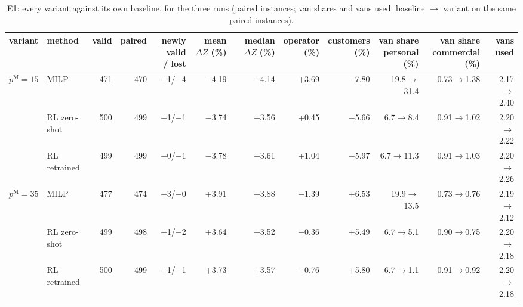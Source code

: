 \begin{table}[H]\centering
\scriptsize
\caption{E1: every variant against its own baseline, for the three runs (paired instances; van shares and vans used: baseline $\to$ variant on the same paired instances).}\label{tab:expE1}
\begin{adjustbox}{max width=\textwidth}\begin{tabular}{llrrrrrrrrrr}\toprule
variant & method & valid & paired & \shortstack{newly valid\\/ lost} & \shortstack{mean\\$\Delta Z$ (\%)} & \shortstack{median\\$\Delta Z$ (\%)} & \shortstack{operator\\(\%)} & \shortstack{customers\\(\%)} & \shortstack{van share\\personal (\%)} & \shortstack{van share\\commercial (\%)} & vans used \\ \midrule
$p^{\mathrm M}=15$ & MILP & 471 & 470 & +1/$-$4 & $-$4.19 & $-$4.14 & +3.69 & $-$7.80 & 19.8$\to$31.4 & 0.73$\to$1.38 & 2.17$\to$2.40 \\
 & RL zero-shot & 500 & 499 & +1/$-$1 & $-$3.74 & $-$3.56 & +0.45 & $-$5.66 & 6.7$\to$8.4 & 0.91$\to$1.02 & 2.20$\to$2.22 \\
 & RL retrained & 499 & 499 & +0/$-$1 & $-$3.78 & $-$3.61 & +1.04 & $-$5.97 & 6.7$\to$11.3 & 0.91$\to$1.03 & 2.20$\to$2.26 \\
$p^{\mathrm M}=35$ & MILP & 477 & 474 & +3/$-$0 & +3.91 & +3.88 & $-$1.39 & +6.53 & 19.9$\to$13.5 & 0.73$\to$0.76 & 2.19$\to$2.12 \\
 & RL zero-shot & 499 & 498 & +1/$-$2 & +3.64 & +3.52 & $-$0.36 & +5.49 & 6.7$\to$5.1 & 0.90$\to$0.75 & 2.20$\to$2.18 \\
 & RL retrained & 500 & 499 & +1/$-$1 & +3.73 & +3.57 & $-$0.76 & +5.80 & 6.7$\to$1.1 & 0.91$\to$0.92 & 2.20$\to$2.18 \\
\bottomrule\end{tabular}\end{adjustbox}\end{table}
